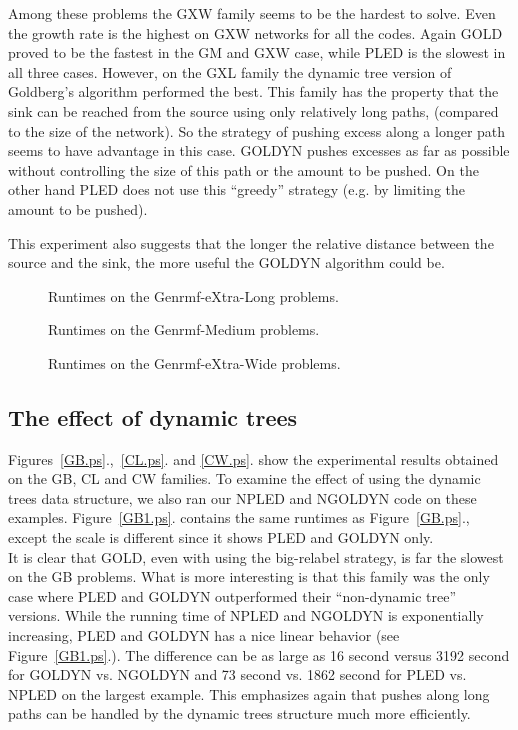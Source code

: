 Among these problems the GXW family seems to be the hardest to solve. 
Even the growth rate is the highest on GXW networks for all the codes.
Again GOLD proved to be the fastest in the GM and GXW case, while
PLED is the slowest in all three cases. However, on the GXL family the
dynamic tree version of Goldberg's algorithm performed the best. This
family has the property that the sink can be reached from the source
using only relatively long paths, (compared to the size of the
network). So 
the strategy of pushing excess along a longer path seems to have
advantage in this case. GOLDYN pushes excesses as far as possible
without controlling the size of 
this path or the amount to be pushed. On the other hand PLED does not
use this ``greedy'' strategy (e.g. by limiting the amount to be pushed).

This experiment also suggests that the longer the relative distance
between the source and the sink, the more useful the GOLDYN
algorithm could be. 

\begin{figure}[h]
\centerline{}
\caption{ Runtimes on the Genrmf-eXtra-Long problems.\label {GL.ps}}
\end{figure}

\begin{figure}[h]
\centerline{}
\caption{ Runtimes on the Genrmf-Medium problems.\label {GM.ps}}
\end{figure}

\begin{figure}[h]
\centerline{}
\caption{ Runtimes on the Genrmf-eXtra-Wide problems. \label {GW.ps}}
\end{figure}

\clearpage
\subsection{The effect of dynamic trees}

Figures~\ref{GB.ps}.,~\ref{CL.ps}. and
\ref{CW.ps}. show the experimental results obtained on the GB, CL and
CW families. To examine the effect of using the dynamic trees data
structure,  
we also ran our NPLED and NGOLDYN code on these examples.
Figure~\ref{GB1.ps}. contains the same runtimes as
Figure~\ref{GB.ps}., except the scale is different since it shows PLED 
and GOLDYN only.\\ 

It is clear that GOLD, even with using the big-relabel strategy, is far
the slowest on the GB problems. What is more interesting is that this
family was the only case where PLED and GOLDYN outperformed their
``non-dynamic tree'' versions. While the running time of NPLED and
NGOLDYN is exponentially increasing, PLED and GOLDYN has a nice linear
behavior (see Figure~\ref{GB1.ps}.). The difference can be as large as 16 second versus
3192 second for GOLDYN vs. NGOLDYN and 73 second vs. 1862 second for
PLED vs. NPLED on the largest example. This emphasizes again that
pushes along long paths can be handled by the dynamic trees structure
much more efficiently. 


